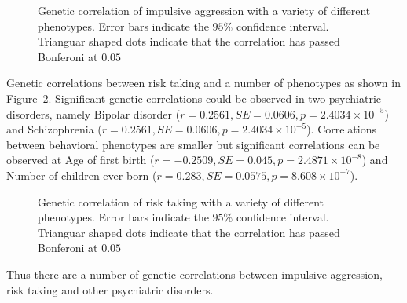 \begin{knitrout}
\color{fgcolor}\begin{figure}
\caption[Genetic correlation of impulsive aggression with a variety of different phenotypes]{Genetic correlation of impulsive aggression with a variety of different phenotypes. Error bars indicate the $95\%$ confidence interval. Trianguar shaped dots indicate that the correlation has passed Bonferoni at $0.05$}\label{fig:corr_agg}
\end{figure}


\end{knitrout}




Genetic correlations between risk taking and a number of phenotypes as shown in Figure~\ref{fig:corr_risk}.
Significant genetic correlations could be observed in two psychiatric disorders, namely
Bipolar disorder ($r=0.2561, SE=0.0606, p=\ensuremath{2.4034\times 10^{-5}}$)
and
Schizophrenia ($r=0.2561, SE=0.0606, p=\ensuremath{2.4034\times 10^{-5}}$).
Correlations between behavioral phenotypes are smaller but significant correlations can be observed at
Age of first birth ($r=\ensuremath{-0.2509}, SE=0.045, p=\ensuremath{2.4871\times 10^{-8}}$)
and
Number of children ever born ($r=0.283, SE=0.0575, p=\ensuremath{8.608\times 10^{-7}}$).

\begin{knitrout}
\color{fgcolor}\begin{figure}
\caption[Genetic correlation of risk taking with a variety of different phenotypes]{Genetic correlation of risk taking with a variety of different phenotypes. Error bars indicate the $95\%$ confidence interval. Trianguar shaped dots indicate that the correlation has passed Bonferoni at $0.05$}\label{fig:corr_risk}
\end{figure}


\end{knitrout}

Thus there are a number of genetic correlations between impulsive aggression, risk taking and other psychiatric disorders.

